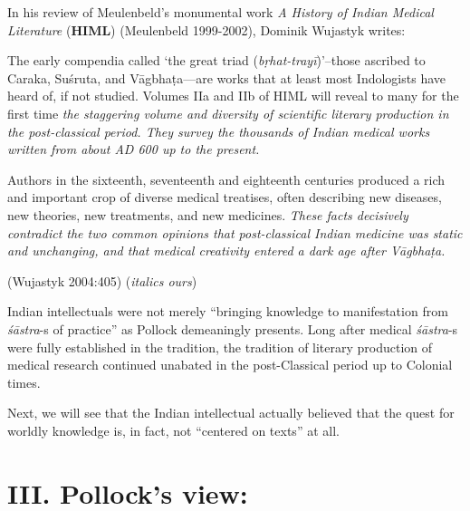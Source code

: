 In his review of Meulenbeld's monumental work {\sl A History of Indian Medical Literature} ({\bf HIML}) (Meulenbeld 1999-2002), Dominik Wujastyk writes:
\begin{myquote}
The early compendia called `the great triad ({\sl bṛhat-trayī})'--those ascribed to Caraka, Suśruta, and Vāgbhaṭa---are works that at least most Indologists have heard of, if not studied. Volumes IIa and IIb of HIML will reveal to many for the first time {\sl the staggering volume and diversity of scientific literary production in the post-classical period. They survey the thousands of Indian medical works written from about AD 600 up to the present.} 

Authors in the sixteenth, seventeenth and eighteenth centuries produced a rich and important crop of diverse medical treatises, often describing new diseases, new theories, new treatments, and new medicines. {\sl These facts decisively contradict the two common opinions that post-classical Indian medicine was static and unchanging, and that medical creativity entered a dark age after Vāgbhaṭa.} 

\hfill (Wujastyk 2004:405) ({\sl italics ours})
\end{myquote}

Indian intellectuals were not merely ``bringing knowledge to manifestation from {\sl śāstra}-s of practice'' as Pollock demeaningly presents.  Long after medical {\sl śāstra}-s were fully established in the tradition, the tradition of literary production of medical research continued unabated in the post-Classical period up to Colonial times.

\newpage

Next, we will see that the Indian intellectual actually believed that the quest for worldly knowledge is, in fact, not ``centered on texts'' at all.

\section*{III. Pollock's view:}

